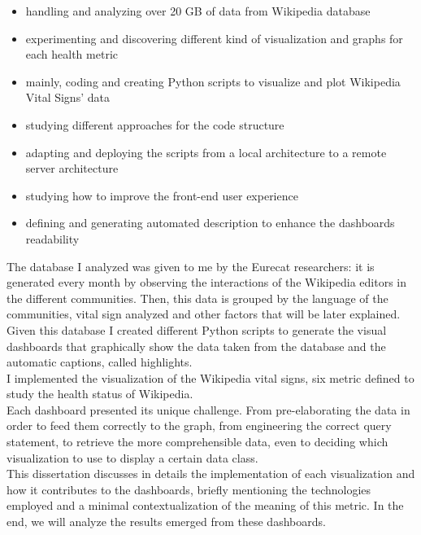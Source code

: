 \begin{itemize}
  \item handling and analyzing over 20 GB of data from Wikipedia database 
    \item experimenting and discovering different kind of visualization and graphs for each health metric
    \item mainly, coding and creating Python scripts to visualize and plot Wikipedia Vital Signs’ data
    \item studying different approaches for the code structure
    \item adapting and deploying the scripts from a local architecture to a remote server architecture
    \item studying how to improve the front-end user experience
    \item defining and generating automated description to enhance the dashboards readability 
\end{itemize}
The database I analyzed was given to me by the Eurecat researchers: it is generated every month by observing the interactions of the Wikipedia editors in the different communities. Then, this data is grouped by the language of the communities, vital sign analyzed and other factors that will be later explained.\\
Given this database I created different Python scripts to generate the visual dashboards that graphically show the data taken from the database and the automatic captions, called highlights.\\
I implemented the visualization of the Wikipedia vital signs, six metric defined to study the health status of Wikipedia.\\
Each dashboard presented its unique challenge. From pre-elaborating the data in order to feed them correctly to the graph, from engineering the correct query statement, to retrieve the more comprehensible data, even to deciding which visualization to use to display a certain data class. \\
This dissertation discusses in details the implementation of each visualization and how it contributes to the dashboards, briefly mentioning the technologies employed and a minimal contextualization of the meaning of this metric. In the end, we will analyze the results emerged from these dashboards.


\pagebreak








